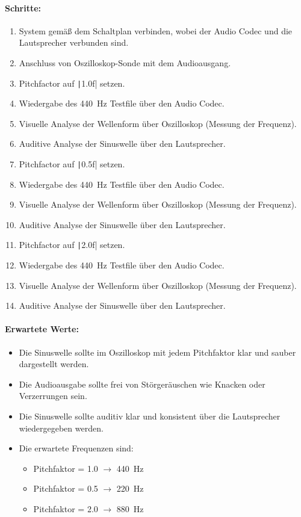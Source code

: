 \paragraph{Schritte:}
\begin{enumerate}
	\item System gemäß dem Schaltplan verbinden, wobei der Audio Codec und die Lautsprecher verbunden sind.
	\item Anschluss von Oszilloskop-Sonde mit dem Audioausgang.
	\item Pitchfactor auf \texttt|1.0f| setzen.
	\item Wiedergabe des \SI{440}{\hertz} Testfile über den Audio Codec.
	\item Visuelle Analyse der Wellenform über Oszilloskop (Messung der Frequenz). 
	\item Auditive Analyse der Sinuswelle über den Lautsprecher.
	
	\item Pitchfactor auf \texttt|0.5f| setzen.
	\item Wiedergabe des \SI{440}{\hertz} Testfile über den Audio Codec.
	\item Visuelle Analyse der Wellenform über Oszilloskop (Messung der Frequenz). 
	\item Auditive Analyse der Sinuswelle über den Lautsprecher.
	
	\item Pitchfactor auf \texttt|2.0f| setzen.
	\item Wiedergabe des \SI{440}{\hertz} Testfile über den Audio Codec.
	\item Visuelle Analyse der Wellenform über Oszilloskop (Messung der Frequenz). 
	\item Auditive Analyse der Sinuswelle über den Lautsprecher.
\end{enumerate}

\paragraph{Erwartete Werte:}
\begin{itemize}
	\item Die Sinuswelle sollte im Oszilloskop mit jedem Pitchfaktor klar und sauber dargestellt werden.
	\item Die Audioausgabe sollte frei von Störgeräuschen wie Knacken oder Verzerrungen sein.
	\item Die Sinuswelle sollte auditiv klar und konsistent über die Lautsprecher wiedergegeben werden.
	\item Die erwartete Frequenzen sind:
		 \begin{itemize}
		 	\item Pitchfaktor = 1.0 \(\rightarrow\) \SI{440}{\hertz}
		 	\item Pitchfaktor = 0.5 \(\rightarrow\) \SI{220}{\hertz}
		 	\item Pitchfaktor = 2.0 \(\rightarrow\) \SI{880}{\hertz}
		 \end{itemize}
\end{itemize}

